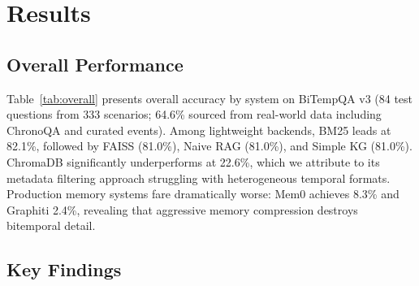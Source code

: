 \section{Results}

\subsection{Overall Performance}
Table~\ref{tab:overall} presents overall accuracy by system on BiTempQA v3 (84 test questions from 333 scenarios; 64.6\% sourced from real-world data including ChronoQA and curated events).
Among lightweight backends, BM25 leads at 82.1\%, followed by FAISS (81.0\%), Naive RAG (81.0\%), and Simple KG (81.0\%).
ChromaDB significantly underperforms at 22.6\%, which we attribute to its metadata filtering approach struggling with heterogeneous temporal formats.
Production memory systems fare dramatically worse: Mem0 achieves 8.3\% and Graphiti 2.4\%, revealing that aggressive memory compression destroys bitemporal detail.

\begin{table}[t]
\centering
{}
\caption{Overall results on BiTempQA v3 (84 test questions). $^{\dagger}$\ ChromaDB uses metadata filtering with limited temporal coverage. Lightweight systems use the same embedding model (paraphrase-multilingual-MiniLM-L12-v2) and top-$k{=}5$.}
\label{tab:overall}
\end{table}

\subsection{Key Findings}

